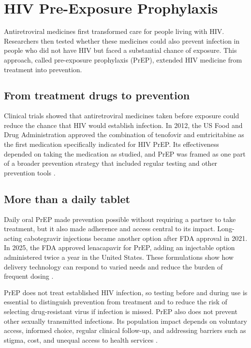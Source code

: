 \documentclass[12pt,oneside]{book}
\begin{document}
\chapter[HIV Pre-Exposure Prophylaxis]{HIV Pre-Exposure Prophylaxis}

Antiretroviral medicines first transformed care for people living with HIV.
Researchers then tested whether these medicines could also prevent infection
in people who did not have HIV but faced a substantial chance of exposure.
This approach, called pre-exposure prophylaxis (PrEP), extended HIV medicine
from treatment into prevention.

\section{From treatment drugs to prevention}
Clinical trials showed that antiretroviral medicines taken before exposure
could reduce the chance that HIV would establish infection. In 2012, the US
Food and Drug Administration approved the combination of tenofovir and
emtricitabine as the first medication specifically indicated for HIV PrEP.
Its effectiveness depended on taking the medication as studied, and PrEP
was framed as one part of a broader prevention strategy that included
regular testing and other prevention tools \cite{fdaPrEPHistory,cdcPrEPHistory}.

\section{More than a daily tablet}
Daily oral PrEP made prevention possible without requiring a partner to
take treatment, but it also made adherence and access central to its impact.
Long-acting cabotegravir injections became another option after FDA approval
in 2021. In 2025, the FDA approved lenacapavir for PrEP, adding an injectable
option administered twice a year in the United States. These formulations
show how delivery technology can respond to varied needs and reduce the
burden of frequent dosing \cite{cdcPrEPGuidance,fdaYeztugoLabel}.

PrEP does not treat established HIV infection, so testing before and during
use is essential to distinguish prevention from treatment and to reduce the
risk of selecting drug-resistant virus if infection is missed. PrEP also
does not prevent other sexually transmitted infections. Its population
impact depends on voluntary access, informed choice, regular clinical
follow-up, and addressing barriers such as stigma, cost, and unequal access
to health services \cite{cdcPrEPGuidance}.
\end{document}
